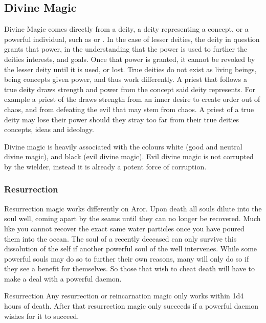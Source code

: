 \subsection{Divine Magic}
\label{sec:Divine Magic}

Divine Magic comes directly from a deity, a deity representing a concept, or a
powerful individual, such as  or . In
the case of lesser deities, the deity in question grants that power, in the
understanding that the power is used to further the deities interests, and
goals. Once that power is granted, it cannot be revoked by the lesser deity
until it is used, or lost. True deities do not exist as living beings, being
concepts given power, and thus work differently. A priest that follows a true
deity draws strength and power from the concept said deity represents. For
example a priest of the  draws strength from an inner desire
to create order out of chaos, and from defeating the evil that may stem from
chaos. A priest of a true deity may lose their power should they stray too
far from their true deities concepts, ideas and ideology.

Divine magic is heavily associated with the colours white (good and neutral
divine magic), and black (evil divine magic). Evil divine magic is not
corrupted by the wielder, instead it is already a potent force of corruption.

\subsubsection{Resurrection}

Resurrection magic works differently on Aror. Upon death all souls dilute into
the soul well, coming apart by the seams until they can no longer be recovered.
Much like you cannot recover the exact same water particles once you have
poured them into the ocean. The soul of a recently deceased can only survive
this dissolution of the self if another powerful soul of the well intervenes.
While some powerful souls may do so to further their own reasons, many will only
do so if they see a benefit for themselves. So those that wish to cheat death
will have to make a deal with a powerful daemon.

\begin{35e}{Resurrection}
  Any resurrection or reincarnation magic only works within 1d4 hours of
  death. After that resurrection magic only succeeds if a powerful daemon
  wishes for it to succeed.
\end{35e}